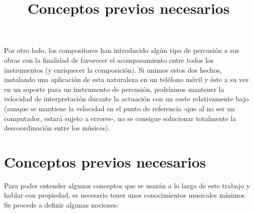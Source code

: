 Por otro lado, los compositores han introducido algún tipo de percusión a sus obras
con la finalidad de favorecer el acompasamiento entre todos los instrumentos (y enriquecer la composición). Si
unimos estos dos hechos, instalando una aplicación de esta naturaleza en un teléfono móvil y éste a su vez en un
soporte para un instrumento de percusión, podríamos mantener la velocidad de interpretación durante la actuación con
un coste relativamente bajo (aunque se mantiene la velocidad en el punto de referencia -que al no ser un computador,
estará sujeto a errores-, no se consigue solucionar totalmente la descoordinación entre los músicos).\\


\title{Conceptos previos necesarios}
\section{Conceptos previos necesarios}
Para poder entender algunos conceptos que se usarán a lo largo de este trabajo y hablar con propiedad,
es necesario tener unos conocimientos musicales mínimos. Se procede a definir algunas nociones:

